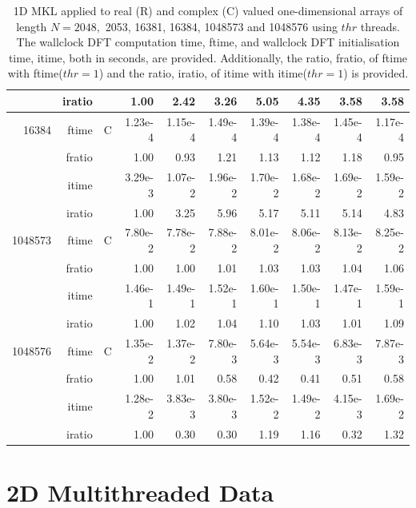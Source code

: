 \documentclass[a4paper]{article}
\begin{document}
\begin{table}[htbp]
\begin{center}
\begin{small}
\begin{tabular}{|r|r|r|r|r|r|r|r|r|r|}
     & iratio & &    1.00 &   2.42 &   3.26 &   5.05 &   4.35 &   3.58 &   3.58  \\ \hline
 16384  & ftime & C &  1.23e-4 &   1.15e-4 &   1.49e-4 &   1.39e-4 &   1.38e-4 &   1.45e-4 &   1.17e-4   \\ 
      & fratio & & 1.00 &   0.93 &   1.21 &   1.13 &   1.12 &   1.18 &   0.95  \\
     & itime & &  3.29e-3 &   1.07e-2 &   1.96e-2 &   1.70e-2 &   1.68e-2 &   1.69e-2 &   1.59e-2   \\ 
 & iratio & & 1.00 &   3.25 &   5.96 &   5.17 &   5.11 &   5.14 &   4.83   \\  \hline 
  1048573  & ftime & C &  7.80e-2 &   7.78e-2 &   7.88e-2 &   8.01e-2 &   8.06e-2 &   8.13e-2 &   8.25e-2      \\ 
      & fratio & &  1.00 &   1.00 &   1.01 &   1.03 &   1.03 &   1.04 &   1.06    \\ 
     & itime & &   1.46e-1 &   1.49e-1 &   1.52e-1 &   1.60e-1 &   1.50e-1 &   1.47e-1 &   1.59e-1   \\ 
     & iratio & &    1.00 &   1.02 &   1.04 &   1.10 &   1.03 &   1.01 &   1.09    \\ \hline 
 1048576  & ftime & C &  1.35e-2 &   1.37e-2 &   7.80e-3 &   5.64e-3 &   5.54e-3 &   6.83e-3 &   7.87e-3   \\ 
      & fratio & &  1.00 &   1.01 &   0.58 &   0.42 &   0.41 &   0.51 &   0.58  \\
     & itime & &  1.28e-2 &   3.83e-3 &   3.80e-3 &   1.52e-2 &   1.49e-2 &   4.15e-3 &   1.69e-2   \\ 
 & iratio & &  1.00 &   0.30 &   0.30 &   1.19 &   1.16 &   0.32 &   1.32 
  \\  \hline 
\end{tabular}
\caption{1D MKL applied to real (R) and complex (C) valued one-dimensional arrays of length $N=2048,$ 2053, 16381, 16384, 1048573 and 1048576  using $thr$ threads. The wallclock DFT computation time, ftime, and wallclock DFT initialisation time, itime, both in seconds, are provided. Additionally,  the ratio, fratio, of ftime  with ftime($thr=1$) and the ratio, iratio, of itime  with itime($thr=1$) is provided. }\label{TblMKL1d}
\end{small}
\end{center}
\end{table}

\clearpage

\section{2D Multithreaded Data}\label{App:2Dthr}
\end{document}
